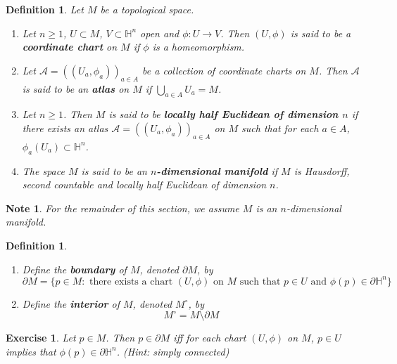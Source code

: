 \documentclass[12pt]{amsart}
\newtheorem{defn}[thm]{Definition}
\newtheorem{note}[thm]{Note}
\newtheorem{ex}[thm]{Exercise}
\renewcommand{\H}{\mathbb{H}}
\newcommand{\MA}{\mathcal{A}}
\begin{document}
	\begin{defn}
		Let $M$ be a topological space.
		\begin{enumerate}
			\item Let $n \geq 1$, $U \subset M$, $V \subset \H^n$ open and $\phi:U \rightarrow V$. Then $(U, \phi)$ is said to be a \textbf{coordinate chart} on $M$ if $\phi$ is a homeomorphism. 
			\item Let $\MA = ((U_a,\phi_{a}))_{a \in A}$ be a collection of coordinate charts on $M$. Then $\MA$ is said to be an \textbf{atlas} on $M$ if  $\bigcup\limits_{a \in A} U_a = M$.
			\item Let $n \geq 1$. Then $M$ is said to be \textbf{locally half Euclidean of dimension $n$} if there exists an atlas $\MA = ((U_a,\phi_{a}))_{a \in A}$ on $M$ such that for each $a \in A$, $\phi_a(U_a) \subset \H^n$.
			\item The space $M$ is said to be an \textbf{$n$-dimensional manifold} if $M$ is Hausdorff, second countable and locally half Euclidean of dimension $n$. 
		\end{enumerate}
	\end{defn}

	\begin{note}
		For the remainder of this section, we assume $M$ is an $n$-dimensional manifold.
	\end{note}

	\begin{defn}\
		\begin{enumerate}
			\item Define the 
			\textbf{boundary} of $M$, denoted $\partial M$, by $$\partial M = \{p \in M: \text{ there exists a chart } (U, \phi) \text{ on } M \text{ such that } p \in U \text{ and } \phi(p) \in \partial \H^n\}$$
			\item Define the 
			\textbf{interior} of $M$, denoted $M^{\circ}$, by $$M^{\circ} = M \setminus \partial M$$
		\end{enumerate}
	\end{defn}

	\begin{ex}
		Let $p \in M$. Then $p \in \partial M$ iff for each chart $(U, \phi)$ on $M$, $p \in U$ implies that $\phi(p) \in \partial \H^n$. (Hint: simply connected)
	\end{ex}
\end{document}
